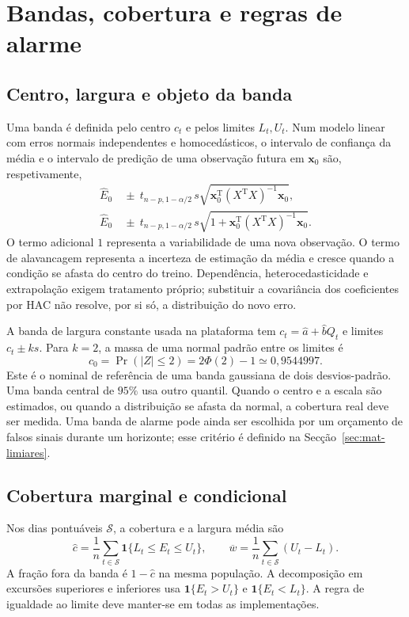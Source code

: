 \section{Bandas, cobertura e regras de alarme}
\label{sec:mat-bandas}

\subsection{Centro, largura e objeto da banda}
\label{sec:mat-tipos-banda}
Uma banda é definida pelo centro $c_t$ e pelos limites $L_t,U_t$. Num modelo linear com erros normais independentes e homocedásticos, o intervalo de confiança da média e o intervalo de predição de uma observação futura em $\boldsymbol x_0$ são, respetivamente,
\begin{align}
\widehat E_0&\ \pm\ t_{n-p,1-\alpha/2}\,s
\sqrt{\boldsymbol x_0^{\mathrm T}(X^{\mathrm T}X)^{-1}\boldsymbol x_0},
\label{eq:mat-ic-media}\\
\widehat E_0&\ \pm\ t_{n-p,1-\alpha/2}\,s
\sqrt{1+\boldsymbol x_0^{\mathrm T}(X^{\mathrm T}X)^{-1}\boldsymbol x_0}.
\label{eq:mat-ip-observacao}
\end{align}
O termo adicional $1$ representa a variabilidade de uma nova observação. O termo de alavancagem representa a incerteza de estimação da média e cresce quando a condição se afasta do centro do treino. Dependência, heterocedasticidade e extrapolação exigem tratamento próprio; substituir a covariância dos coeficientes por HAC não resolve, por si só, a distribuição do novo erro.

A banda de largura constante usada na plataforma tem $c_t=\widehat a+\widehat bQ_t$ e limites $c_t\pm ks$. Para $k=2$, a massa de uma normal padrão entre os limites é
\begin{equation}
c_0=\Pr(|Z|\leq2)=2\Phi(2)-1\simeq0{,}9544997.
\label{eq:mat-dois-sigma}
\end{equation}
Este é o nominal de referência de uma banda gaussiana de dois desvios-padrão. Uma banda central de $95\%$ usa outro quantil. Quando o centro e a escala são estimados, ou quando a distribuição se afasta da normal, a cobertura real deve ser medida. Uma banda de alarme pode ainda ser escolhida por um orçamento de falsos sinais durante um horizonte; esse critério é definido na Secção~\ref{sec:mat-limiares}.

\subsection{Cobertura marginal e condicional}
\label{sec:mat-cobertura}
Nos dias pontuáveis $\mathcal S$, a cobertura e a largura média são
\begin{equation}
\widehat c=\frac1n\sum_{t\in\mathcal S}\mathbf1\{L_t\leq E_t\leq U_t\},
\qquad \overline w=\frac1n\sum_{t\in\mathcal S}(U_t-L_t).
\label{eq:mat-cobertura}
\end{equation}
A fração fora da banda é $1-\widehat c$ na mesma população. A decomposição em excursões superiores e inferiores usa $\mathbf1\{E_t>U_t\}$ e $\mathbf1\{E_t<L_t\}$. A regra de igualdade ao limite deve manter-se em todas as implementações.

